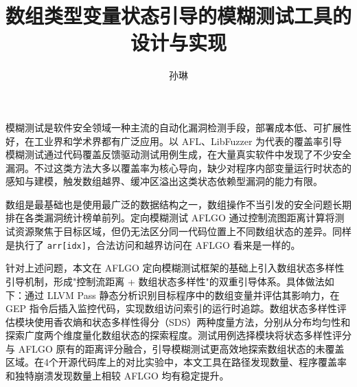 \documentclass[bachelor]{njupthesis}
\title{数组类型变量状态引导的模糊测试工具的设计与实现}
\author{孙琳}
\begin{document}
\makecover

\begin{chineseabstract}
模糊测试是软件安全领域一种主流的自动化漏洞检测手段，部署成本低、可扩展性好，在工业界和学术界都有广泛应用。以 AFL、LibFuzzer 为代表的覆盖率引导模糊测试通过代码覆盖反馈驱动测试用例生成，在大量真实软件中发现了不少安全漏洞。不过这类方法大多以覆盖率为核心导向，缺少对程序内部变量运行时状态的感知与建模，触发数组越界、缓冲区溢出这类状态依赖型漏洞的能力有限。

数组是最基础也是使用最广泛的数据结构之一，数组操作不当引发的安全问题长期排在各类漏洞统计榜单前列。定向模糊测试 AFLGO 通过控制流图距离计算将测试资源聚焦于目标区域，但仍无法区分同一代码位置上不同数组状态的差异。同样是执行了 \texttt{arr[idx]}，合法访问和越界访问在 AFLGO 看来是一样的。

针对上述问题，本文在 AFLGO 定向模糊测试框架的基础上引入数组状态多样性引导机制，形成"控制流距离 + 数组状态多样性"的双重引导体系。具体做法如下：通过 LLVM Pass 静态分析识别目标程序中的数组变量并评估其影响力，在 GEP 指令后插入监控代码，实现数组访问索引的运行时追踪。数组状态多样性评估模块使用香农熵和状态多样性得分（SDS）两种度量方法，分别从分布均匀性和探索广度两个维度量化数组状态的探索程度。测试用例选择模块将状态多样性评分与 AFLGO 原有的距离评分融合，引导模糊测试更高效地探索数组状态的未覆盖区域。在4个开源代码库上的对比实验中，本文工具在路径发现数量、程序覆盖率和独特崩溃发现数量上相较 AFLGO 均有稳定提升。

\end{chineseabstract}
\end{document}
